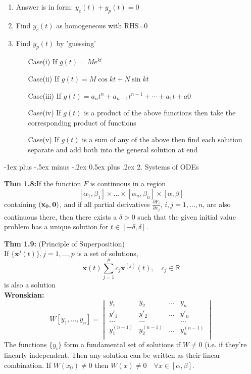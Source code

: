 \documentclass[10pt,landscape]{article}
\makeatletter
\renewcommand{\section}{\@startsection{section}{1}{0mm}%
                                {-1ex plus -.5ex minus -.2ex}%
                                {0.5ex plus .2ex}%
                                {\normalfont\large\bfseries}}
\makeatother
\begin{document}
\begin{multicols}{2}
\begin{enumerate}
    \item Answer is in form: $y_c(t)+y_p(t)=0$
    \item Find $y_c(t)$ as homogeneous with RHS=0
    \item Find $y_p(t)$ by 'guessing'
    \begin{enumerate}
        \item[Case(i)] If $g(t)=Me^{kt}$
        \item[Case(ii)] If $g(t)= M\cos{kt} + N\sin{kt}$
        \item[Case(iii)] If $g(t)= a_nt^n+a_{n-1}t^{n-1}+\cdots+a_1t+a0$ 
        \item[Case(iv)] If $g(t)$ is a product of the above functions then take the corresponding product of functions
        \item[Case(v)] If $g(t)$ is a sum of any of the above then find each solution separate and add both into the general solution at end
    \end{enumerate}
\end{enumerate}

\section{2. Systems of ODEs}

\textbf{Thm 1.8:}If the function \( F \) is continuous in a region\\ 
\[
[\alpha_1, \beta_1] \times \dots \times [\alpha_n, \beta_n] \times [\alpha, \beta]
\]
containing \((\bf{x}_0, 0)\), and if all partial derivatives \(\frac{\partial F_i}{\partial x_j}\), \(i, j = 1, \dots, n\), are also continuous there, then there exists a \(\delta > 0\) such that the given initial value problem has a unique solution for \(t \in [-\delta, \delta]\).

\textbf{Thm 1.9:} (Principle of Superposition)\\ If $\{\textbf{x}^{j}(t)\}, j =1,\dots,p$ is a set of solutions, \\$$\textbf{x}(t)\sum_{j=1}^pc_j\textbf{x}^{(j)}(t), \quad c_j\in \mathbb{R}$$ is also a solution\\
\bigskip
\textbf{Wronskian:}
\begin{equation*}
   	 W[y_1,...,y_n] = \begin{vmatrix}
   	   y_1       &  y_2  & \dots &  y_n \\ 
  	    y'_1       &  y'_2 & \dots &  y'_n\\
    	  \dots  & \dots&      & \dots    \\
   	   y^{(n-1)}_1   & y^{(n-1)}_2 & \dots & y^{(n-1)}_n\\ 
   	 \end{vmatrix} 
 	 \end{equation*}
	  The functions $\{y_i\}$ form a fundamental set of solutions if $ W \neq 0$ (i.e. if they're linearly independent. Then any solution can be written as their linear combination. If $W(x_0) \neq 0$ then $W(x) \neq 0 \quad \forall x \in [\alpha, \beta].$ 


\end{multicols}
\end{document}
